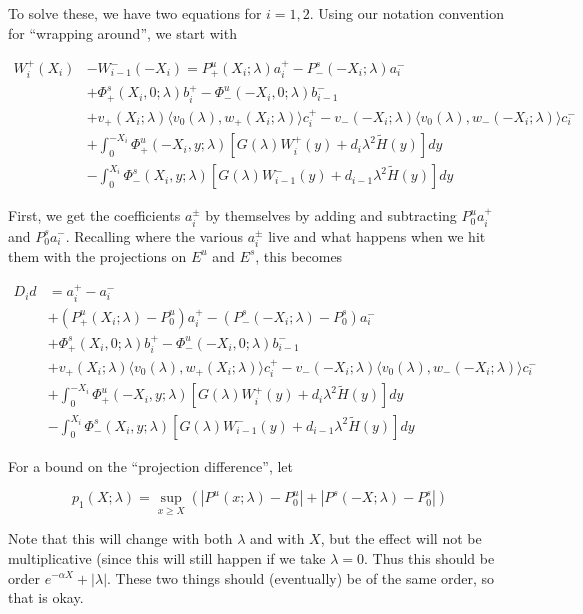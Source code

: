 \documentclass[12pt]{article}
\begin{document}
\begin{enumerate}
To solve these, we have two equations for $i = 1, 2$. Using our notation convention for ``wrapping around'', we start with

\begin{align*}
W_i^+(X_i) &- W_{i-1}^-(-X_i) = P^u_+(X_i; \lambda) a_i^+ - P^s_-(-X_i; \lambda) a_i^- \\
&+ \Phi^s_+(X_i, 0; \lambda)b_i^+ - \Phi^u_-(-X_i, 0; \lambda)b_{i-1}^- \\
&+ v_+(X_i; \lambda) \langle v_0(\lambda), w_+(X_i; \lambda) \rangle c_i^+ - v_-(-X_i; \lambda) \langle v_0(\lambda), w_-(-X_i; \lambda) \rangle c_i^- \\
&+ \int_0^{-X_i} \Phi^u_+(-X_i, y; \lambda) [ G(\lambda)W_i^+(y) + d_i \lambda^2 \tilde{H}(y) ] dy \\
&- \int_0^{X_i} \Phi^s_-(X_i, y; \lambda) [ G(\lambda)W_{i-1}^-(y) + d_{i-1} \lambda^2 \tilde{H}(y) ] dy
\end{align*}

First, we get the coefficients $a_i^\pm$ by themselves by adding and subtracting $P_0^u a_i^+$ and $P_0^s a_i^-$. Recalling where the various $a_i^\pm$ live and what happens when we hit them with the projections on $E^u$ and $E^s$, this becomes

\begin{align*}
D_i d &= a_i^+ - a_i^- \\
&+ (P^u_+(X_i; \lambda) - P_0^u)a_i^+ - (P^s_-(-X_i; \lambda) - P_0^s)a_i^- \\
&+ \Phi^s_+(X_i, 0; \lambda)b_i^+ - \Phi^u_-(-X_i, 0; \lambda)b_{i-1}^- \\
&+ v_+(X_i; \lambda) \langle v_0(\lambda), w_+(X_i; \lambda) \rangle c_i^+ - v_-(-X_i; \lambda) \langle v_0(\lambda), w_-(-X_i; \lambda) \rangle c_i^- \\
&+ \int_0^{-X_i} \Phi^u_+(-X_i, y; \lambda) [ G(\lambda)W_i^+(y) + d_i \lambda^2 \tilde{H}(y) ] dy \\
&- \int_0^{X_i} \Phi^s_-(X_i, y; \lambda) [ G(\lambda)W_{i-1}^-(y) + d_{i-1} \lambda^2 \tilde{H}(y) ] dy
\end{align*}

For a bound on the ``projection difference'', let

\[
p_1(X;\lambda) = \sup_{x \geq X} (|P^u(x;\lambda) - P_0^u| + |P^s(-X;\lambda) - P_0^s|)
\]

Note that this will change with both $\lambda$ and with $X$, but the effect will not be multiplicative (since this will still happen if we take $\lambda = 0$. Thus this should be order $e^{-\alpha X} + |\lambda|$. These two things should (eventually) be of the same order, so that is okay.
\\


\end{enumerate}
\end{document}
